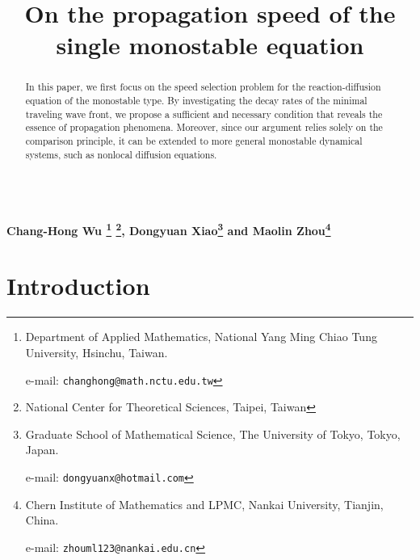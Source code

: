 \documentclass[11pt,a4paper]{article}
\title{On the propagation speed
 of the single monostable equation}
\date{}
\author{}
\numberwithin{equation}{section}
\numberwithin{figure}{section}
\begin{document}
\maketitle
\vspace{-30pt}
\begin{center}
{\large\bf
Chang-Hong Wu
\footnote{Department of Applied Mathematics, National Yang Ming Chiao Tung University, Hsinchu, Taiwan.

e-mail: {\tt changhong@math.nctu.edu.tw}}
\footnote{National Center for Theoretical Sciences, Taipei, Taiwan},
Dongyuan Xiao\footnote{Graduate School of Mathematical Science, The University of Tokyo, Tokyo, Japan.

e-mail: {\tt dongyuanx@hotmail.com}} and
Maolin Zhou\footnote{Chern Institute of Mathematics and LPMC, Nankai University, Tianjin, China.

e-mail: {\tt zhouml123@nankai.edu.cn}}
} \\
[2ex]
\end{center}


\begin{abstract}
In this paper, we first focus on the speed selection problem for the reaction-diffusion equation of the monostable type. By investigating the decay rates of the minimal traveling wave front, we propose a sufficient and necessary condition that reveals the essence of propagation phenomena. Moreover, since our argument relies solely on the comparison principle, it can be extended to more general monostable dynamical systems, such as nonlocal diffusion equations.
\\

\\

\end{abstract}

\section{Introduction}
\end{document}
